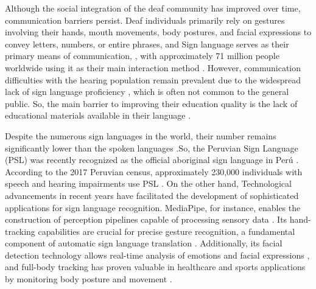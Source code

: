 \documentclass[preprint,12pt,authoryear]{elsarticle}
\begin{document}
Although the social integration of the deaf community has improved over time, communication barriers persist. Deaf individuals primarily rely on gestures involving their hands, mouth movements, body postures, and facial expressions to convey letters, numbers, or entire phrases, and Sign language serves as their primary means of communication,  \cite{Arezoo},  with approximately 71 million people worldwide using it as their main interaction method \cite{siddique23}. However, communication difficulties with the hearing population remain prevalent due to the widespread lack of sign language proficiency \cite{arellano22}, which is often not common to the general public.
So, the main barrier to improving their education quality is the lack of educational materials available in their language \cite{gamarra20}. %

Despite the numerous sign languages in the world, their number remains significantly lower than the spoken languages \cite{zeshan06}.So, the Peruvian Sign Language (PSL) was recently recognized as the official aboriginal sign language in Perú \cite{MIMP}. According to the 2017 Peruvian census, approximately 230,000 individuals with speech and hearing impairments use PSL \citet{portocarrero23}.
On the other hand, Technological advancements in recent years have facilitated the development of sophisticated applications for sign language recognition. MediaPipe, for instance, enables the construction of perception pipelines capable of processing sensory data \cite{lugaresi19}. Its hand-tracking capabilities are crucial for precise gesture recognition, a fundamental component of automatic sign language translation \cite{zhang20}. Additionally, its facial detection technology allows real-time analysis of emotions and facial expressions \cite{cai21}, and full-body tracking has proven valuable in healthcare and sports applications by monitoring body posture and movement \cite{mediapipe21}.
\end{document}
